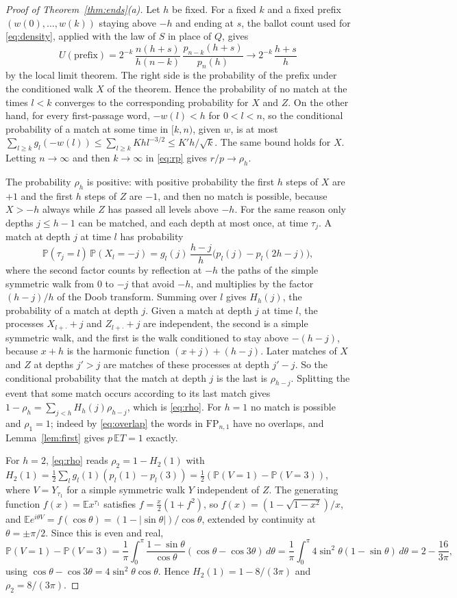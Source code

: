 \documentclass[11pt]{amsart}
\theoremstyle{remark}
\numberwithin{equation}{section}
\newcommand{\PP}{\mathbb{P}}
\newcommand{\EE}{\mathbb{E}}
\newcommand{\FP}{\mathrm{FP}}
\begin{document}
\begin{proof}[Proof of Theorem~\ref{thm:ends}(a)]
Let $h$ be fixed. For a fixed $k$ and a fixed prefix $(w(0),\dots,w(k))$ staying above $-h$ and ending at $s$, the ballot count used for \eqref{eq:density}, applied with the law of $S$ in place of $Q$, gives
\[
U(\text{prefix})=2^{-k}\,\frac{n(h+s)}{h(n-k)}\,\frac{p_{n-k}(h+s)}{p_n(h)}\to2^{-k}\,\frac{h+s}h
\]
by the local limit theorem. The right side is the probability of the prefix under the conditioned walk $X$ of the theorem. Hence the probability of no match at the times $l<k$ converges to the corresponding probability for $X$ and $Z$. On the other hand, for every first-passage word, $-w(l)<h$ for $0<l<n$, so the conditional probability of a match at some time in $[k,n)$, given $w$, is at most $\sum_{l\ge k}g_l(-w(l))\le\sum_{l\ge k}Khl^{-3/2}\le K'h/\sqrt k$. The same bound holds for $X$. Letting $n\to\infty$ and then $k\to\infty$ in \eqref{eq:rp} gives $r/p\to\rho_h$.

The probability $\rho_h$ is positive: with positive probability the first $h$ steps of $X$ are $+1$ and the first $h$ steps of $Z$ are $-1$, and then no match is possible, because $X>-h$ always while $Z$ has passed all levels above $-h$. For the same reason only depths $j\le h-1$ can be matched, and each depth at most once, at time $\tau_j$. A match at depth $j$ at time $l$ has probability
\[
\PP(\tau_j=l)\,\PP(X_l=-j)=g_l(j)\,\frac{h-j}h\bigl(p_l(j)-p_l(2h-j)\bigr),
\]
where the second factor counts by reflection at $-h$ the paths of the simple symmetric walk from $0$ to $-j$ that avoid $-h$, and multiplies by the factor $(h-j)/h$ of the Doob transform. Summing over $l$ gives $H_h(j)$, the probability of a match at depth $j$. Given a match at depth $j$ at time $l$, the processes $X_{l+\cdot}+j$ and $Z_{l+\cdot}+j$ are independent, the second is a simple symmetric walk, and the first is the walk conditioned to stay above $-(h-j)$, because $x+h$ is the harmonic function $(x+j)+(h-j)$. Later matches of $X$ and $Z$ at depths $j'>j$ are matches of these processes at depth $j'-j$. So the conditional probability that the match at depth $j$ is the last is $\rho_{h-j}$. Splitting the event that some match occurs according to its last match gives $1-\rho_h=\sum_{j<h}H_h(j)\rho_{h-j}$, which is \eqref{eq:rho}. For $h=1$ no match is possible and $\rho_1=1$; indeed by \eqref{eq:overlap} the words in $\FP_{n,1}$ have no overlaps, and Lemma~\ref{lem:first} gives $p\,\EE T=1$ exactly.

For $h=2$, \eqref{eq:rho} reads $\rho_2=1-H_2(1)$ with $H_2(1)=\frac12\sum_lg_l(1)(p_l(1)-p_l(3))=\frac12(\PP(V=1)-\PP(V=3))$, where $V=Y_{\tau_1}$ for a simple symmetric walk $Y$ independent of $Z$. The generating function $f(x)=\EE x^{\tau_1}$ satisfies $f=\frac x2(1+f^2)$, so $f(x)=(1-\sqrt{1-x^2})/x$, and $\EE e^{i\theta V}=f(\cos\theta)=(1-|\sin\theta|)/\cos\theta$, extended by continuity at $\theta=\pm\pi/2$. Since this is even and real,
\[
\PP(V=1)-\PP(V=3)=\frac1\pi\int_0^\pi\frac{1-\sin\theta}{\cos\theta}(\cos\theta-\cos3\theta)\,d\theta=\frac1\pi\int_0^\pi4\sin^2\theta(1-\sin\theta)\,d\theta=2-\frac{16}{3\pi},
\]
using $\cos\theta-\cos3\theta=4\sin^2\theta\cos\theta$. Hence $H_2(1)=1-8/(3\pi)$ and $\rho_2=8/(3\pi)$.
\end{proof}
\end{document}

